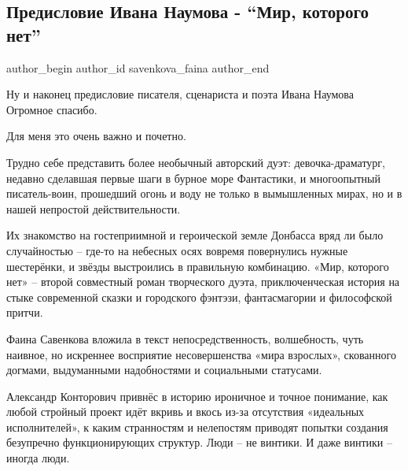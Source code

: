  
 
 
 
 
 
\subsection{Предисловие Ивана Наумова - \enquote{Мир, которого нет}}
\label{sec:23_12_2021.fb.savenkova_faina.2.naumov_ivan_predislovie}
 
\ifcmt
 author_begin
   author_id savenkova_faina
 author_end
\fi

Ну и наконец  предисловие писателя, сценариста и поэта Ивана Наумова Огромное
спасибо.

Для меня это очень важно и почетно.

Трудно себе представить более необычный авторский дуэт: девочка-драматург,
недавно сделавшая первые шаги в бурное море Фантастики, и многоопытный
писатель-воин, прошедший огонь и воду не только в вымышленных мирах, но и в
нашей непростой действительности. 


Их знакомство на гостеприимной и героической земле Донбасса вряд ли было
случайностью – где-то на небесных осях вовремя повернулись нужные шестерёнки, и
звёзды выстроились в правильную комбинацию.  «Мир, которого нет» – второй
совместный роман творческого дуэта, приключенческая история на стыке
современной сказки и городского фэнтэзи, фантасмагории и философской притчи.

Фаина Савенкова вложила в текст непосредственность, волшебность, чуть наивное,
но искреннее восприятие несовершенства «мира взрослых», скованного догмами,
выдуманными надобностями и социальными статусами. 

Александр Конторович привнёс в историю ироничное и точное понимание, как любой
стройный проект идёт вкривь и вкось из-за отсутствия «идеальных исполнителей»,
к каким странностям и нелепостям приводят попытки создания безупречно
функционирующих структур. Люди – не винтики. И даже винтики – иногда люди.


